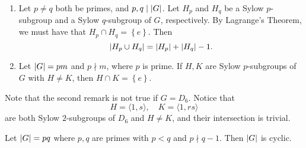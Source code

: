\documentclass[notoc,notitlepage]{tufte-book}
\begin{document}
\begin{remark}
  \begin{enumerate}
    \item Let $p \neq q$ both be primes, and $p, q \mid \left| G \right|$. Let
      $H_p$ and $H_q$ be a Sylow $p$-subgroup and a Sylow $q$-subgroup of $G$,
      respectively. By Lagrange's Theorem, we must have that
      $H_p \cap H_q = \left\{ e \right\}$. Then
      \begin{equation*}
        \left| H_p \cup H_q \right| = \left| H_p \right| + \left| H_q \right| - 1.
      \end{equation*}

    \item Let $\left| G \right| = pm$ and $p \nmid m$, where $p$ is prime. If $H, K$ are
      Sylow $p$-subgroups of $G$ with $H \neq K$, then $H \cap K = \left\{ e \right\}$.
  \end{enumerate}
\end{remark}

\begin{eg}
  Note that the second remark is not true if $G = D_6$. Notice that
  \begin{equation*}
    H = \langle 1, s \rangle, \quad K = \langle 1, rs \rangle
  \end{equation*}
  are both Sylow $2$-subgroups of $D_6$ and $H \neq K$, and their intersection is
  trivial.
\end{eg}

\begin{eg}
  Let $\left| G \right| = pq$ where $p, q$ are primes with $p < q$ and $p \nmid q - 1$.
  Then $\left|G\right|$ is cyclic.
\end{eg}
\end{document}
